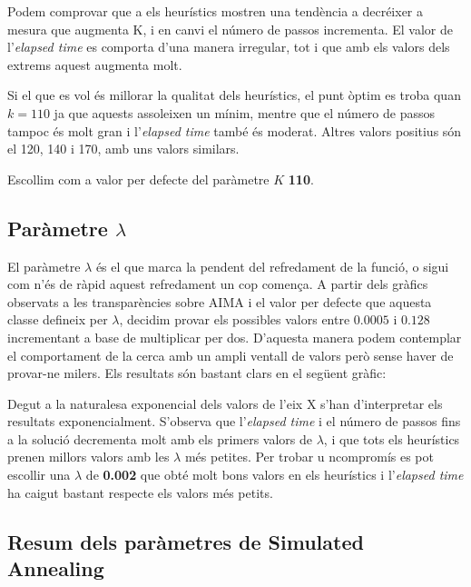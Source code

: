 
Podem comprovar que a els heurístics mostren una tendència a decréixer a mesura que augmenta K, i en canvi el número de passos incrementa. El valor de l'\emph{elapsed time} es comporta d'una manera irregular, tot i que amb els valors dels extrems aquest augmenta molt.

Si el que es vol és millorar la qualitat dels heurístics, el punt òptim es troba quan $k = 110$ ja que aquests assoleixen un mínim, mentre que el número de passos tampoc és molt gran i l'\emph{elapsed time} també és moderat. Altres valors positius són el 120, 140 i 170, amb uns valors similars.

Escollim com a valor per defecte del paràmetre $K$ \textbf{110}.


\newpage
\subsection{Paràmetre $\lambda$} %
\label{sub:parametre_lambda}

El paràmetre $\lambda$ és el que marca la pendent del refredament de la funció, o sigui com n'és de ràpid aquest refredament un cop comença. A partir dels gràfics observats a les transparències sobre AIMA i el valor per defecte que aquesta classe defineix per $\lambda$, decidim provar els possibles valors entre $0.0005$ i $0.128$ incrementant a base de multiplicar per dos. D'aquesta manera podem contemplar el comportament de la cerca amb un ampli ventall de valors però sense haver de provar-ne milers. Els resultats són bastant clars en el següent gràfic:


Degut a la naturalesa exponencial dels valors de l'eix X s'han d'interpretar els resultats exponencialment. S'observa que l'\emph{elapsed time} i el número de passos fins a la solució decrementa molt amb els primers valors de $\lambda$, i que tots els heurístics prenen millors valors amb les $\lambda$ més petites. Per trobar u ncompromís es pot escollir una $\lambda$ de \textbf{0.002} que obté molt bons valors en els heurístics i l'\emph{elapsed time} ha caigut bastant respecte els valors més petits.

\subsection{Resum dels paràmetres de Simulated Annealing} %
\label{sub:resum_parametres}

